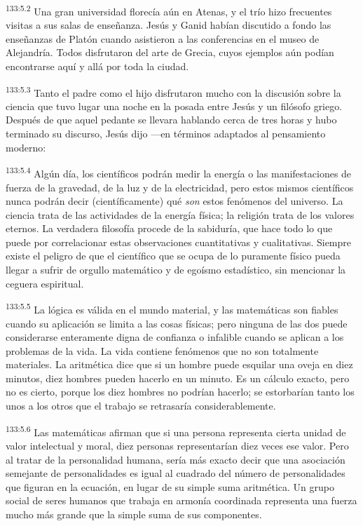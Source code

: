 \par 
\textsuperscript{133:5.2} Una gran universidad florecía aún en Atenas, y el trío hizo frecuentes visitas a sus salas de enseñanza. Jesús y Ganid habían discutido a fondo las enseñanzas de Platón cuando asistieron a las conferencias en el museo de Alejandría. Todos disfrutaron del arte de Grecia, cuyos ejemplos aún podían encontrarse aquí y allá por toda la ciudad.

\par 
\textsuperscript{133:5.3} Tanto el padre como el hijo disfrutaron mucho con la discusión sobre la ciencia que tuvo lugar una noche en la posada entre Jesús y un filósofo griego. Después de que aquel pedante se llevara hablando cerca de tres horas y hubo terminado su discurso, Jesús dijo ---en términos adaptados al pensamiento moderno:

\par 
\textsuperscript{133:5.4} Algún día, los científicos podrán medir la energía o las manifestaciones de fuerza de la gravedad, de la luz y de la electricidad, pero estos mismos científicos nunca podrán decir (científicamente) qué \textit{son} estos fenómenos del universo. La ciencia trata de las actividades de la energía física; la religión trata de los valores eternos. La verdadera filosofía procede de la sabiduría, que hace todo lo que puede por correlacionar estas observaciones cuantitativas y cualitativas. Siempre existe el peligro de que el científico que se ocupa de lo puramente físico pueda llegar a sufrir de orgullo matemático y de egoísmo estadístico, sin mencionar la ceguera espiritual.

\par 
\textsuperscript{133:5.5} La lógica es válida en el mundo material, y las matemáticas son fiables cuando su aplicación se limita a las cosas físicas; pero ninguna de las dos puede considerarse enteramente digna de confianza o infalible cuando se aplican a los problemas de la vida. La vida contiene fenómenos que no son totalmente materiales. La aritmética dice que si un hombre puede esquilar una oveja en diez minutos, diez hombres pueden hacerlo en un minuto. Es un cálculo exacto, pero no es cierto, porque los diez hombres no podrían hacerlo; se estorbarían tanto los unos a los otros que el trabajo se retrasaría considerablemente.

\par 
\textsuperscript{133:5.6} Las matemáticas afirman que si una persona representa cierta unidad de valor intelectual y moral, diez personas representarían diez veces ese valor. Pero al tratar de la personalidad humana, sería más exacto decir que una asociación semejante de personalidades es igual al cuadrado del número de personalidades que figuran en la ecuación, en lugar de su simple suma aritmética. Un grupo social de seres humanos que trabaja en armonía coordinada representa una fuerza mucho más grande que la simple suma de sus componentes.

